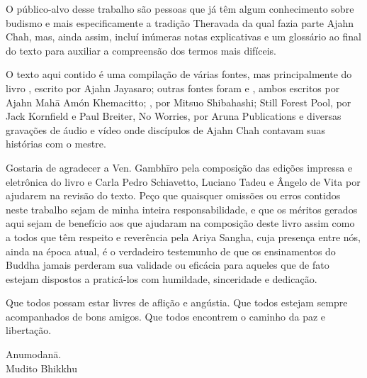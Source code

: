 O público-alvo desse trabalho são pessoas que já têm algum conhecimento
sobre budismo e mais especificamente a tradição Theravada da qual fazia
parte Ajahn Chah, mas, ainda assim, incluí inúmeras notas explicativas e
um glossário ao final do texto para auxiliar a compreensão dos termos
mais difíceis.

O texto aqui contido é uma compilação de várias fontes, mas
principalmente do livro , escrito por Ajahn Jayasaro; outras
fontes foram  e , ambos escritos por Ajahn
Mahā Amón Khemacitto; , por Mitsuo Shibahashi;
Still Forest Pool, por Jack Kornfield e Paul Breiter, No Worries, por
Aruna Publications e diversas gravações de áudio e vídeo onde discípulos
de Ajahn Chah contavam suas histórias com o mestre.

Gostaria de agradecer a Ven. Gambhīro pela composição das edições
impressa e eletrônica do livro e Carla Pedro Schiavetto, Luciano Tadeu e
Ângelo de Vita por ajudarem na revisão do texto. Peço que quaisquer
omissões ou erros contidos neste trabalho sejam de minha inteira
responsabilidade, e que os méritos gerados aqui sejam de benefício aos
que ajudaram na composição deste livro assim como a todos que têm
respeito e reverência pela Ariya Sangha, cuja presença entre nós, ainda
na época atual, é o verdadeiro testemunho de que os ensinamentos do
Buddha jamais perderam sua validade ou eficácia para aqueles que de fato
estejam dispostos a praticá-los com humildade, sinceridade e dedicação.

Que todos possam estar livres de aflição e angústia. Que todos estejam
sempre acompanhados de bons amigos. Que todos encontrem o caminho da paz
e libertação.

\bigskip

{\raggedleft
Anumodanā.\\
Mudito Bhikkhu
\par}
